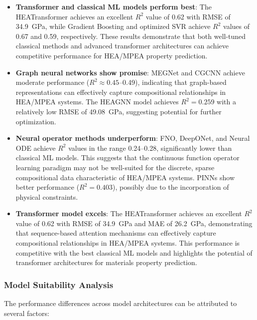 \documentclass[11pt,a4paper]{article}
\begin{document}
\begin{itemize}
  \item \textbf{Transformer and classical ML models perform best}: The HEATransformer achieves an excellent $R^2$ value of 0.62 with RMSE of 34.9~GPa, while Gradient Boosting and optimized SVR achieve $R^2$ values of 0.67 and 0.59, respectively. These results demonstrate that both well-tuned classical methods and advanced transformer architectures can achieve competitive performance for HEA/MPEA property prediction.
  
  \item \textbf{Graph neural networks show promise}: MEGNet and CGCNN achieve moderate performance ($R^2 \approx 0.45$--0.49), indicating that graph-based representations can effectively capture compositional relationships in HEA/MPEA systems. The HEAGNN model achieves $R^2 = 0.259$ with a relatively low RMSE of 49.08~GPa, suggesting potential for further optimization.
  
  \item \textbf{Neural operator methods underperform}: FNO, DeepONet, and Neural ODE achieve $R^2$ values in the range 0.24--0.28, significantly lower than classical ML models. This suggests that the continuous function operator learning paradigm may not be well-suited for the discrete, sparse compositional data characteristic of HEA/MPEA systems. PINNs show better performance ($R^2 = 0.403$), possibly due to the incorporation of physical constraints.
  
  \item \textbf{Transformer model excels}: The HEATransformer achieves an excellent $R^2$ value of 0.62 with RMSE of 34.9~GPa and MAE of 26.2~GPa, demonstrating that sequence-based attention mechanisms can effectively capture compositional relationships in HEA/MPEA systems. This performance is competitive with the best classical ML models and highlights the potential of transformer architectures for materials property prediction.
\end{itemize}

\subsubsection{Model Suitability Analysis}

The performance differences across model architectures can be attributed to several factors:
\end{document}
